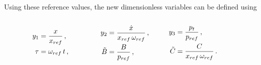 Using these reference values, the new dimensionless variables can be defined using
~
\begin{equation*}
\begin{tabular}{p{3cm} p{3cm} p{3cm}}
    $ \begin{aligned}
        y_1 &= \frac{x}{x_{ref}} \, , \\
        \tau &= \omega_{ref} \, t \, ,
    \end{aligned} $ &
    $ \begin{aligned}
        y_2 &= \frac{\dot{x}}{x_{ref} \, \omega_{ref}} \, , \\
        \tilde{B} &= \frac{B}{p_{ref}} \, ,
    \end{aligned} $ &
    $ \begin{aligned}
        y_3 &= \frac{p_t}{p_{ref}} \, , \\
        \tilde{C} &= \frac{C}{x_{ref} \, \omega_{ref}} \, .
    \end{aligned} $
\end{tabular}
\end{equation*}

